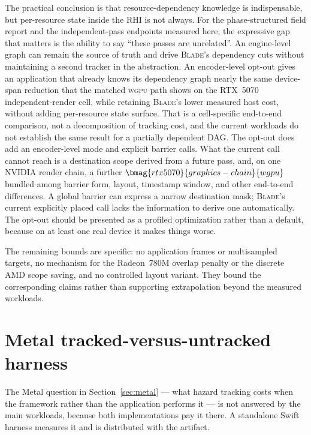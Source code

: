 \documentclass[10pt,twocolumn]{article}
\newcommand{\blade}{\textsc{Blade}}
\newcommand{\wgpu}{\textsc{wgpu}}
\begin{document}
The practical conclusion is that resource-dependency knowledge is
indispensable, but per-resource state inside the RHI is not always. For the
phase-structured field report and the independent-pass endpoints measured
here, the expressive gap that matters is the ability to say ``these passes are
unrelated''. An engine-level graph can remain the source of truth and drive
\blade's dependency cuts without maintaining a second tracker in the
abstraction. An encoder-level opt-out gives an application that already knows
its dependency graph nearly the same device-span reduction that the matched
\wgpu{} path shows on the RTX~5070 independent-render cell, while retaining
\blade's lower measured host cost, without adding per-resource state surface.
That is a cell-specific end-to-end comparison, not a decomposition of tracking
cost, and the current workloads do not establish the same result for a
partially dependent DAG. The opt-out does add an
encoder-level mode and explicit barrier calls. What the current call cannot
reach is a destination scope derived from a future pass, and, on
one NVIDIA render chain, a further $\bmag{rtx5070}{graphics-chain}{wgpu}$
bundled among barrier form, layout, timestamp window, and other end-to-end differences. A global
barrier can express a narrow destination mask; \blade's current explicitly
placed call lacks the information to derive one automatically. The
opt-out should be presented as a profiled optimization rather than a default,
because on at least one real device it makes things worse.

The remaining bounds are specific: no application frames or multisampled
targets, no mechanism for the Radeon~780M overlap penalty or the discrete AMD
scope saving, and no controlled layout variant.
They bound the corresponding claims rather than supporting extrapolation
beyond the measured workloads.




\appendix

\section{Metal tracked-versus-untracked harness}
\label{sec:metal-harness}

The Metal question in Section~\ref{sec:metal} --- what hazard tracking costs
when the framework rather than the application performs it --- is not answered
by the main workloads, because both implementations pay it there. A standalone
Swift harness measures it and is distributed with the artifact.
\end{document}
